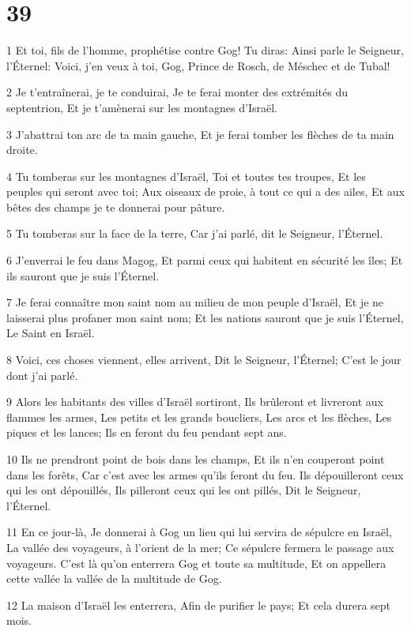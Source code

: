 \chapter{39}

\par 1 Et toi, fils de l'homme, prophétise contre Gog! Tu diras: Ainsi parle le Seigneur, l'Éternel: Voici, j'en veux à toi, Gog, Prince de Rosch, de Méschec et de Tubal!
\par 2 Je t'entraînerai, je te conduirai, Je te ferai monter des extrémités du septentrion, Et je t'amènerai sur les montagnes d'Israël.
\par 3 J'abattrai ton arc de ta main gauche, Et je ferai tomber les flèches de ta main droite.
\par 4 Tu tomberas sur les montagnes d'Israël, Toi et toutes tes troupes, Et les peuples qui seront avec toi; Aux oiseaux de proie, à tout ce qui a des ailes, Et aux bêtes des champs je te donnerai pour pâture.
\par 5 Tu tomberas sur la face de la terre, Car j'ai parlé, dit le Seigneur, l'Éternel.
\par 6 J'enverrai le feu dans Magog, Et parmi ceux qui habitent en sécurité les îles; Et ils sauront que je suis l'Éternel.
\par 7 Je ferai connaître mon saint nom au milieu de mon peuple d'Israël, Et je ne laisserai plus profaner mon saint nom; Et les nations sauront que je suis l'Éternel, Le Saint en Israël.
\par 8 Voici, ces choses viennent, elles arrivent, Dit le Seigneur, l'Éternel; C'est le jour dont j'ai parlé.
\par 9 Alors les habitants des villes d'Israël sortiront, Ils brûleront et livreront aux flammes les armes, Les petits et les grands boucliers, Les arcs et les flèches, Les piques et les lances; Ils en feront du feu pendant sept ans.
\par 10 Ils ne prendront point de bois dans les champs, Et ils n'en couperont point dans les forêts, Car c'est avec les armes qu'ils feront du feu. Ils dépouilleront ceux qui les ont dépouillés, Ils pilleront ceux qui les ont pillés, Dit le Seigneur, l'Éternel.
\par 11 En ce jour-là, Je donnerai à Gog un lieu qui lui servira de sépulcre en Israël, La vallée des voyageurs, à l'orient de la mer; Ce sépulcre fermera le passage aux voyageurs. C'est là qu'on enterrera Gog et toute sa multitude, Et on appellera cette vallée la vallée de la multitude de Gog.
\par 12 La maison d'Israël les enterrera, Afin de purifier le pays; Et cela durera sept mois.
